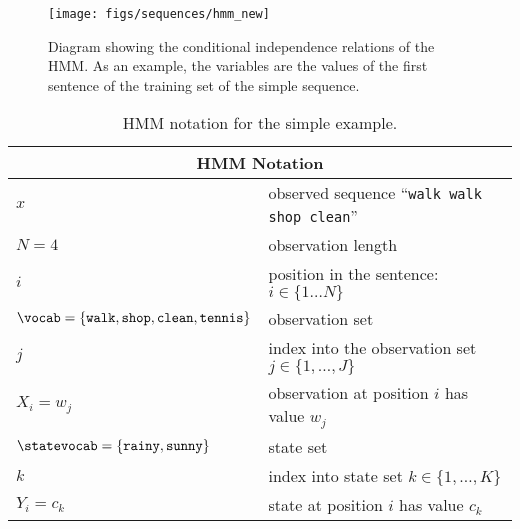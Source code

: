 \begin{figure}[ht]
\centering
\texttt{[image: figs/sequences/hmm\_new]}
\caption[HMM running example]{\label{fig:hmm}Diagram showing the conditional independence relations of the HMM. As an example, the variables are the values of the first sentence of the training set of the simple sequence.}
\end{figure}

\begin{table}[h]
\begin{center}
\begin{tabular}{|l|l|}
\hline
\multicolumn{2}{|c|}{HMM Notation}\\
\hline
\hline
$x$ & observed sequence ``{\tt walk walk shop clean}'' \\
\hline
$N = 4$ & observation length \\
\hline
$i$ & position in the sentence: $i \in \{1 \ldots N\}$ \\
\hline
$\vocab = \{\text{{\tt walk}},\text{{\tt shop}},\text{{\tt clean}},\text{{\tt tennis}}\}$ & observation set \\
\hline 
$j$ & index into the observation set $j \in \{1,\ldots, J\}$\\
\hline
$X_i = w_j$ & observation at position $i$ 
has value $w_j$\\
\hline 
$\statevocab = \{\text{{\tt rainy}},\text{{\tt sunny}}\}$ & state set\\
\hline 
$k$ & index into state set $k \in \{1,\ldots,K\}$\\
\hline
$Y_i = c_k$ & state at position $i$ has value $c_k$ \\ %
\hline
\end{tabular}
\end{center}
\caption[HMM notation]{\label{tab:hmm-simple-notation} HMM notation for the simple example.}
\end{table}



